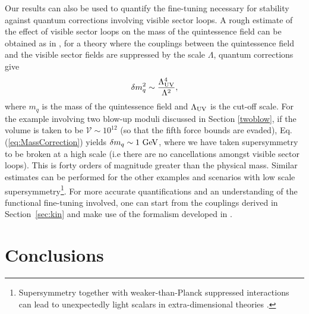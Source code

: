 \documentclass[11pt,a4paper]{article}
\newcommand{\V}{\mathcal{V}}
\def\pref#1{(\ref{#1})}
\begin{document}
Our results can also be used to quantify the fine-tuning necessary for stability against quantum corrections involving visible sector loops. A rough estimate of the effect of visible sector loops on the mass of the quintessence field can be obtained as in \cite{Adelberger:2003zx}, for a theory  where the couplings between the quintessence field and the visible sector fields are suppressed by the scale $\Lambda$, quantum corrections give
%
\begin{equation}
\label{eq:MassCorrection}
\delta m_q^2 \sim {\Lambda_{\rm UV}^4 \over \Lambda^2},
\end{equation}
%
where $m_q$ is the mass of the quintessence field and $\Lambda_{\rm UV}$ is the cut-off scale. For the example involving two blow-up moduli discussed in Section \ref{twoblow}, if the volume is taken to be $\V \sim 10^{12}$ (so that the fifth force bounds are evaded), Eq. \pref{eq:MassCorrection} yields $\delta m_q \sim 1 \ {\rm GeV}$, where we have taken supersymmetry to be broken at a high scale (i.e there are no cancellations amongst visible sector loops). This is forty orders of magnitude greater than the physical mass. Similar estimates can be performed for the other examples and scenarios with low scale supersymmetry\footnote{Supersymmetry together with weaker-than-Planck suppressed interactions can lead to unexpectedly light scalars in extra-dimensional theories \cite{uber}.}. For more accurate quantifications and an understanding of the functional fine-tuning involved, one can start from the couplings derived in  Section~\ref{sec:kin} and make use of the formalism developed in \cite{Garny:2006wc}.




\section{Conclusions}
\label{sec:conc}
\end{document}
